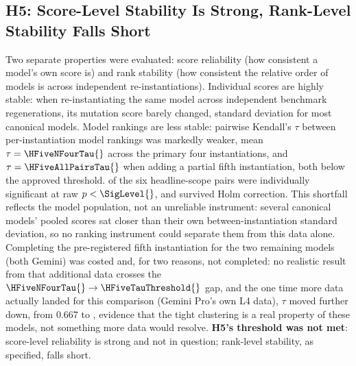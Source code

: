 \subsection{H5: Score-Level Stability Is Strong, Rank-Level Stability Falls Short}
\label{sec:results-h5}
Two separate properties were evaluated: score reliability (how consistent a model's own score is) and rank stability (how consistent the relative order of models is across independent re-instantiations). Individual scores are highly stable: when re-instantiating the same model across independent benchmark regenerations, its mutation score barely changed, standard deviation \HFiveSdRange{} for most canonical models. Model rankings are less stable: pairwise Kendall's $\tau$ between per-instantiation model rankings was markedly weaker, mean $\tau=\HFiveNFourTau{}$ across the primary four instantiations, and $\tau=\HFiveAllPairsTau{}$ when adding a partial fifth instantiation, both below the approved \HFiveTauThreshold{} threshold. \HFiveNFourSigCount{} of the six headline-scope pairs were individually significant at raw $p<\SigLevel{}$, and \HFiveNFourHolmCount{} survived Holm correction. This shortfall reflects the model population, not an unreliable instrument: several canonical models' pooled scores sat closer than their own between-instantiation standard deviation, so no ranking instrument could separate them from this data alone. Completing the pre-registered fifth instantiation for the two remaining models (both Gemini) was costed and, for two reasons, not completed: no realistic result from that additional data crosses the $\HFiveNFourTau{}\rightarrow\HFiveTauThreshold{}$ gap, and the one time more data actually landed for this comparison (Gemini Pro's own L4 data), $\tau$ moved further down, from 0.667 to \HFiveNFourTau{}, evidence that the tight clustering is a real property of these models, not something more data would resolve. \textbf{H5's threshold was not met}: score-level reliability is strong and not in question; rank-level stability, as specified, falls short. %

